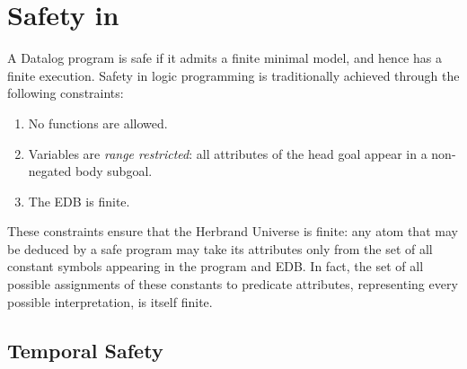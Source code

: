 \section{Safety in \large \bf \slang}

A Datalog program is safe if it admits a finite minimal model, and hence has
a finite execution.  Safety in logic programming is traditionally achieved
through the following constraints:

\begin{enumerate}
%
\item No functions are allowed.
%
\item Variables are \emph{range restricted}: all attributes of the head goal
appear in a non-negated body subgoal.
%
\item The EDB is finite.
%
\end{enumerate}

These constraints ensure that the Herbrand Universe is finite: any atom that
may be deduced by a safe program may take its attributes only from the 
set of all constant symbols appearing in the program and EDB.
In fact, the set of all possible assignments of these constants to predicate
attributes, representing every possible interpretation, is itself finite. 


  

\subsection{Temporal Safety}

